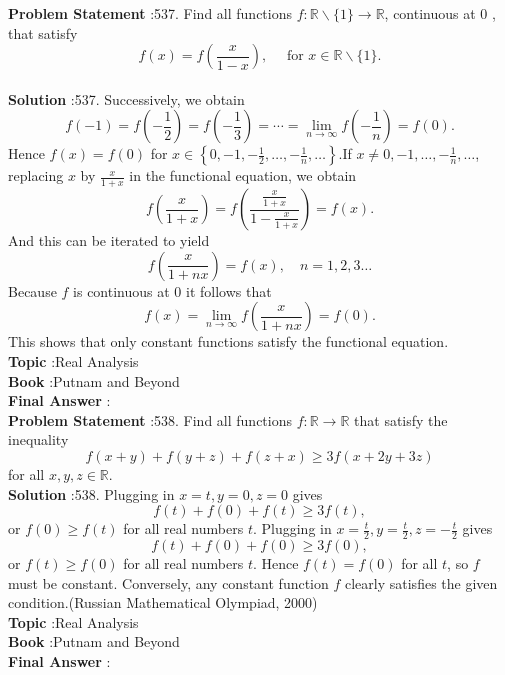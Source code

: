 \documentclass[10pt]{article}
\begin{document}
\textbf{Problem Statement} :537. Find all functions $f: \mathbb{R} \backslash\{1\} \rightarrow \mathbb{R}$, continuous at 0 , that satisfy$$ f(x)=f\left(\frac{x}{1-x}\right), \quad \text { for } x \in \mathbb{R} \backslash\{1\} . $$\\
\textbf{Solution} :537. Successively, we obtain$$ f(-1)=f\left(-\frac{1}{2}\right)=f\left(-\frac{1}{3}\right)=\cdots=\lim _{n \rightarrow \infty} f\left(-\frac{1}{n}\right)=f(0) . $$Hence $f(x)=f(0)$ for $x \in\left\{0,-1,-\frac{1}{2}, \ldots,-\frac{1}{n}, \ldots\right\}$.If $x \neq 0,-1, \ldots,-\frac{1}{n}, \ldots$, replacing $x$ by $\frac{x}{1+x}$ in the functional equation, we obtain$$ f\left(\frac{x}{1+x}\right)=f\left(\frac{\frac{x}{1+x}}{1-\frac{x}{1+x}}\right)=f(x) . $$And this can be iterated to yield$$ f\left(\frac{x}{1+n x}\right)=f(x), \quad n=1,2,3 \ldots $$Because $f$ is continuous at 0 it follows that$$ f(x)=\lim _{n \rightarrow \infty} f\left(\frac{x}{1+n x}\right)=f(0) . $$This shows that only constant functions satisfy the functional equation.\\
\textbf{Topic} :Real Analysis\\
\textbf{Book} :Putnam and Beyond\\
\textbf{Final Answer} :\\


\textbf{Problem Statement} :538. Find all functions $f: \mathbb{R} \rightarrow \mathbb{R}$ that satisfy the inequality$$ f(x+y)+f(y+z)+f(z+x) \geq 3 f(x+2 y+3 z) $$for all $x, y, z \in \mathbb{R}$.\\
\textbf{Solution} :538. Plugging in $x=t, y=0, z=0$ gives$$ f(t)+f(0)+f(t) \geq 3 f(t), $$or $f(0) \geq f(t)$ for all real numbers $t$. Plugging in $x=\frac{t}{2}, y=\frac{t}{2}, z=-\frac{t}{2}$ gives$$ f(t)+f(0)+f(0) \geq 3 f(0), $$or $f(t) \geq f(0)$ for all real numbers $t$. Hence $f(t)=f(0)$ for all $t$, so $f$ must be constant. Conversely, any constant function $f$ clearly satisfies the given condition.(Russian Mathematical Olympiad, 2000)\\
\textbf{Topic} :Real Analysis\\
\textbf{Book} :Putnam and Beyond\\
\textbf{Final Answer} :\\
\end{document}
